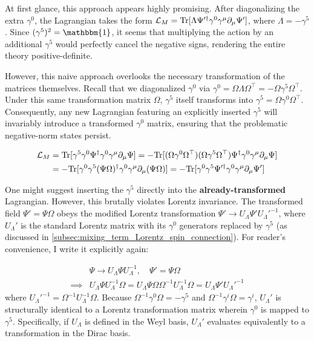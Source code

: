At first glance, this approach appears highly promising. After diagonalizing the extra $\gamma^0$, the Lagrangian takes the form $\mathcal{L}_M={\rm Tr}[\Lambda \Psi'^\dagger \gamma^0\gamma^\mu\partial_\mu\Psi']$, where $\Lambda=-\gamma^5$. Since $(\gamma^5)^2=\mathbbm{1}$, it seems that multiplying the action by an additional $\gamma^5$ would perfectly cancel the negative signs, rendering the entire theory positive-definite. 

However, this naive approach overlooks the necessary transformation of the matrices themselves. Recall that we diagonalized $\gamma^0$ via $\gamma^0=\Omega \Lambda\Omega^\top=-\Omega \gamma^5\Omega^\top$. Under this same transformation matrix $\Omega$, $\gamma^5$ itself transforms into $\gamma^5=\Omega\gamma^0\Omega^\top$. Consequently, any new Lagrangian featuring an explicitly inserted $\gamma^5$ will invariably introduce a transformed $\gamma^0$ matrix, ensuring that the problematic negative-norm states persist. 

\begin{equation}
\begin{aligned}
    \mathcal{L}_M&={\rm Tr}[\gamma^5\gamma^0 \Psi^\dagger \gamma^0\gamma^\mu\partial_\mu\Psi]
    =-{\rm Tr}[(\Omega \gamma^0\Omega^\top)(\Omega \gamma^5\Omega^\top)\Psi^\dagger \gamma^0\gamma^\mu\partial_\mu\Psi]\\
    &=-{\rm Tr}[\gamma^0\gamma^5(\Psi\Omega)^\dagger\gamma^0\gamma^\mu\partial_\mu(\Psi\Omega)]
    =-{\rm Tr}[\gamma^0\gamma^5\Psi'^\dagger\gamma^0\gamma^\mu\partial_\mu \Psi']
\end{aligned}
\end{equation}

One might suggest inserting the $\gamma^5$ directly into the \textbf{already-transformed} Lagrangian. However, this brutally violates Lorentz invariance. The transformed field $\Psi'=\Psi\Omega$ obeys the modified Lorentz transformation $\Psi'\to U_\Lambda \Psi' U_\Lambda'^{-1}$, where $U_\Lambda'$ is the standard Lorentz matrix with its $\gamma^0$ generators replaced by $\gamma^5$ (as discussed in \cref{subsec:mixing_term_Lorentz_spin_connection}). For reader's convenience, I write it explicitly again:

\begin{equation}
\begin{aligned}
    &\Psi\to U_\Lambda \Psi U_\Lambda^{-1}
    , \quad \Psi'=\Psi\Omega \\
    \implies & U_\Lambda \Psi U_\Lambda^{-1}\Omega =U_\Lambda \Psi \Omega \Omega^{-1}U_\Lambda^{-1} \Omega=U_\Lambda \Psi' U_\Lambda'^{-1}
\end{aligned}
\end{equation}
where $U_\Lambda'^{-1}=\Omega^{-1}U_\Lambda^{-1} \Omega$.
Because $\Omega^{-1}\gamma^0 \Omega=-\gamma^5$ and $\Omega^{-1}\gamma^i \Omega=\gamma^i$, $U_\Lambda'$ is structurally identical to a Lorentz transformation matrix wherein $\gamma^0$ is mapped to $\gamma^5$. Specifically, if $U_\Lambda$ is defined in the Weyl basis, $U_\Lambda'$ evaluates equivalently to a transformation in the Dirac basis.

